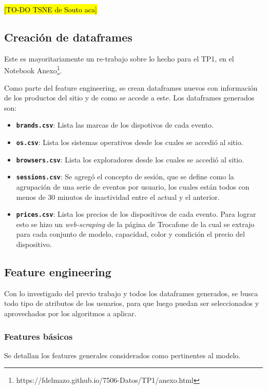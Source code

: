 \documentclass[a4paper]{article}
\begin{document}
\hl{[TO-DO TSNE de Souto aca]}

\subsection{Creación de dataframes}

Este es mayoritariamente un re-trabajo sobre lo hecho para el TP1, en el Notebook Anexo\footnote{https://fdelmazo.github.io/7506-Datos/TP1/anexo.html}.

Como parte del feature engineering, se crean dataframes nuevos con información de los productos del sitio y de como se accede a este. Los dataframes generados son:

\begin{itemize}
	\item \textbf{\texttt{brands.csv}}: Lista las marcas de los dispotivos de cada evento.
	\item \textbf{\texttt{os.csv}}: Lista los sistemas operativos desde los cuales se accedió al sitio.
	\item \textbf{\texttt{browsers.csv}}: Lista los exploradores desde los cuales se accedió al sitio.
	\item \textbf{\texttt{sessions.csv}}:  Se agregó el concepto de sesión, que se define como la agrupación de una serie de eventos por usuario, los cuales están todos con menos de 30 minutos de inactividad entre el actual y el anterior. 
	\item \textbf{\texttt{prices.csv}}: Lista los precios de los dispositivos de cada evento. Para lograr esto se hizo un \textit{web-scraping} de la página de Trocafone de la cual se extrajo para cada conjunto de modelo, capacidad, color y condición el precio del dispositivo.
\end{itemize}

\subsection{Feature engineering}

Con lo investigado del previo trabajo y todos los dataframes generados, se busca todo tipo de atributos de los usuarios, para que luego puedan ser seleccionados y aprovechados por los algoritmos a aplicar.

\subsubsection{Features básicos}
Se detallan los features generales considerados como pertinentes al modelo.
\end{document}
